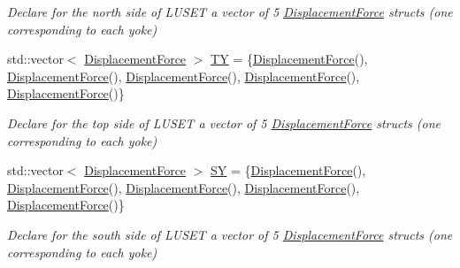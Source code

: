 \begin{DoxyCompactItemize}
\begin{DoxyCompactList}\small\item\em Declare for the north side of L\+U\+S\+ET a vector of 5 \hyperlink{structlusetstatenamespace_1_1LusetState_1_1DisplacementForce}{Displacement\+Force} structs (one corresponding to each yoke) \end{DoxyCompactList}\item 
std\+::vector$<$ \hyperlink{structlusetstatenamespace_1_1LusetState_1_1DisplacementForce}{Displacement\+Force} $>$ \hyperlink{classlusetstatenamespace_1_1LusetState_a492da5d53a18a795c781cefb3ceb98c9}{TY} = \{\hyperlink{structlusetstatenamespace_1_1LusetState_1_1DisplacementForce}{Displacement\+Force}(), \hyperlink{structlusetstatenamespace_1_1LusetState_1_1DisplacementForce}{Displacement\+Force}(), \hyperlink{structlusetstatenamespace_1_1LusetState_1_1DisplacementForce}{Displacement\+Force}(), \hyperlink{structlusetstatenamespace_1_1LusetState_1_1DisplacementForce}{Displacement\+Force}(), \hyperlink{structlusetstatenamespace_1_1LusetState_1_1DisplacementForce}{Displacement\+Force}()\}
\begin{DoxyCompactList}\small\item\em Declare for the top side of L\+U\+S\+ET a vector of 5 \hyperlink{structlusetstatenamespace_1_1LusetState_1_1DisplacementForce}{Displacement\+Force} structs (one corresponding to each yoke) \end{DoxyCompactList}\item 
std\+::vector$<$ \hyperlink{structlusetstatenamespace_1_1LusetState_1_1DisplacementForce}{Displacement\+Force} $>$ \hyperlink{classlusetstatenamespace_1_1LusetState_a2cc7ce891b92ece12b0d5679dba5728c}{SY} = \{\hyperlink{structlusetstatenamespace_1_1LusetState_1_1DisplacementForce}{Displacement\+Force}(), \hyperlink{structlusetstatenamespace_1_1LusetState_1_1DisplacementForce}{Displacement\+Force}(), \hyperlink{structlusetstatenamespace_1_1LusetState_1_1DisplacementForce}{Displacement\+Force}(), \hyperlink{structlusetstatenamespace_1_1LusetState_1_1DisplacementForce}{Displacement\+Force}(), \hyperlink{structlusetstatenamespace_1_1LusetState_1_1DisplacementForce}{Displacement\+Force}()\}
\begin{DoxyCompactList}\small\item\em Declare for the south side of L\+U\+S\+ET a vector of 5 \hyperlink{structlusetstatenamespace_1_1LusetState_1_1DisplacementForce}{Displacement\+Force} structs (one corresponding to each yoke) \end{DoxyCompactList}\end{DoxyCompactItemize}


